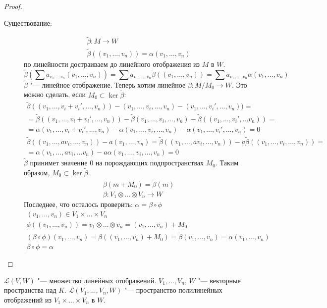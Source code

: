 \begin{description}
\begin{proof}
\begin{description}
	\item[Существование:]
		\begin{gather*}
			\tilde \beta\colon M \to W \\
			\tilde \beta((v_1, \dots, v_n)) = \alpha(v_1, \dots, v_n)
		\end{gather*}
		по линейности достраиваем до линейного отображения из $M$ в $W$.
		\[ \tilde \beta\left(\sum a_{v_1 \dots, v_n}(v_1, \dots, v_n)\right) = \sum a_{v_1, \dots, v_n} \tilde \beta((v_1, \dots, v_n)) = \sum a_{v_1, \dots, v_n} \alpha(v_1, \dots, v_n) \]
		$\tilde \beta$ "--- линейное отображение.
		Теперь хотим линейное $\beta\colon M/M_0 \to W$.
		Это можно сделать, если $M_0 \subset \ker \tilde \beta$:
		\begin{gather*}
			\tilde \beta((v_1, \dots, v_i + v_i', \dots, v_n)) - (v_1, \dots, v_i, \dots, v_n) - (v_1, \dots, v_i', \dots, v_n)) = \\
			= \tilde \beta((v_1, \dots, v_i + v_i', \dots, v_n)) - \tilde \beta(v_1, \dots, v_i, \dots, v_n)
			- \tilde \beta((v_1, \dots,v_i', \dots v_n)) = \\
			= \alpha(v_1, \dots, v_i + v_i', \dots, v_n) - \alpha(v_1, \dots, v_i, \dots, v_n) - \alpha(v_1, \dots,v_i', \dots,  v_n)
			= 0 \\
			\tilde \beta((v_1, \dots, a v_i,\dots, v_n)) - a(v_1, \dots, v_n)
			= \tilde \beta((v_1, \dots, a v_i, \dots, v_n)) - a \tilde \beta((v_1, \dots, v_i,\dots, v_n)) = \\
			= \alpha(v_1, \dots, a v_i, \dots v_n) - a\alpha(v_1, \dots, v_i, \dots, v_n)
			= 0
		\end{gather*}
		$\tilde \beta$ принимет значение 0 на порождающих подпространствах $M_0$.
		Таким образом, $M_0 \subset \ker \tilde \beta$.
		\begin{gather*}
			\beta(m + M_0) = \tilde \beta(m) \\
			\beta \colon V_1 \otimes \dots \otimes V_n \to W
		\end{gather*}
		Последнее, что осталось проверить: $\alpha = \beta \circ \phi$
		\begin{gather*}
			(v_1, \dots, v_n) \in V_1 \times \dots \times V_n \\
			\phi((v_1, \dots, v_n)) = v_1 \otimes \dots \otimes v_n = (v_1, \dots, v_n) + M_0 \\
			(\beta \circ \phi)(v_1, \dots, v_n) = \beta((v_1, \dots, v_n) + M_0)
			= \tilde \beta(v_1, \dots, v_n) = \alpha(v_1, \dots, v_n) \\
			\beta \circ \phi = \alpha
		\end{gather*}
	\end{description}\end{proof}
	$\mathcal L(V, W)$ "--- множество линейных отображений.
	$V_1, \dots, V_n$, $W$ "--- векторные пространства над $K$.
	$\mathcal L(V_1, \dots, V_n, W)$ "--- пространство полилинейных отображений из $V_1 \times \dots \times V_n$ в $W$.


\end{description}
